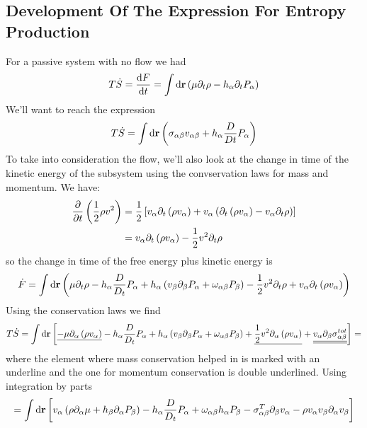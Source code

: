 \subsection{Development Of The Expression For Entropy Production}
For a passive system with no flow we had
\begin{equation}
    T\dot{S} = \diff{F}{t} = \int \dd\vec{r} \ins{\mu\del_t\rho - h_\alpha\del_t P_\alpha}
\end{equation}
We'll want to reach the expression
\begin{equation}
    T\dot{S} = \int \mathop{}\!\mathrm{d}\mathbf{r} \left(\sigma_{\alpha\beta} v_{\alpha\beta} + h_\alpha \frac{D}{Dt}P_\alpha\right)
\end{equation}
To take into consideration the flow, we'll also look at the change in time of the kinetic energy of the subsystem using the convservation laws for mass and momentum. We have:
\begin{align}
    \diffp*{\ins{\frac{1}{2}\rho v^2}}{t} &= \frac{1}{2}\left[v_\alpha\del_t\ins{\rho v_\alpha}+v_\alpha\ins{\del_t\ins{\rho v_\alpha}-v_\alpha \del_t\rho}\right] \\
    &= v_\alpha\del_t\ins{\rho v_\alpha}-\frac{1}{2}v^2\del_t\rho 
\end{align}
so the change in time of the free energy plus kinetic energy is
\begin{equation}
    \dot{F} = \int \mathop{}\!\mathrm{d}\mathbf{r} \left(\mu\partial_t\rho - h_\alpha\frac{D}{D_t} P_\alpha + h_\alpha\left(v_\beta\partial_\beta P_\alpha+\omega_{\alpha\beta}P_\beta\right)-\frac{1}{2}v^2\partial_t\rho + v_\alpha\partial_t\left(\rho v_\alpha\right)\right)
\end{equation}
Using the conservation laws we find
\begin{equation}
    T\dot{S} = \int \mathop{}\!\mathrm{d}\mathbf{r} \left[\underline{-\mu\partial_\alpha\left(\rho v_\alpha\right)}-h_\alpha\frac{D}{D_t}P_\alpha+h_\alpha\left(v_\beta\partial_\beta P_\alpha + \omega_{\alpha\beta}P_\beta\right)+\underline{\frac{1}{2}v^2\partial_\alpha\left(\rho v_\alpha\right)}+\underline{\underline{v_\alpha\partial_\beta\sigma_{\alpha\beta}^{tot}}}\right] =
\end{equation}
where the element where mass conservation helped in is marked with an underline and the one for momentum conservation is double underlined. Using integration by parts
\begin{equation}
    = \int \mathop{}\!\mathrm{d}\mathbf{r} \left[v_\alpha\left(\rho\partial_\alpha\mu + h_\beta\partial_\alpha P_\beta\right)-h_\alpha\frac{D}{D_t}P_\alpha + \omega_{\alpha\beta} h_\alpha P_\beta - \sigma_{\alpha\beta}^T\partial_\beta v_\alpha -\rho v_\alpha v_\beta \partial_\alpha v_\beta\right]
\end{equation}
